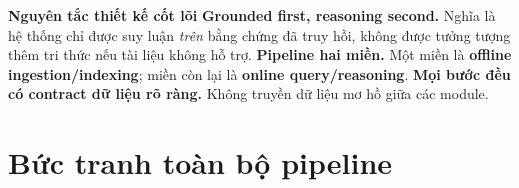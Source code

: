 \documentclass[12pt,a4paper]{article}
\begin{document}
\begin{overviewbox}
\textbf{Nguyên tắc thiết kế cốt lõi}\newline
\textbf{Grounded first, reasoning second.} Nghĩa là hệ thống chỉ được suy luận \textit{trên} bằng chứng đã truy hồi, không được tưởng tượng thêm tri thức nếu tài liệu không hỗ trợ.\newline
\textbf{Pipeline hai miền.} Một miền là \textbf{offline ingestion/indexing}; miền còn lại là \textbf{online query/reasoning}.\newline
\textbf{Mọi bước đều có contract dữ liệu rõ ràng.} Không truyền dữ liệu mơ hồ giữa các module.
\end{overviewbox}

\section{Bức tranh toàn bộ pipeline}
\end{document}
